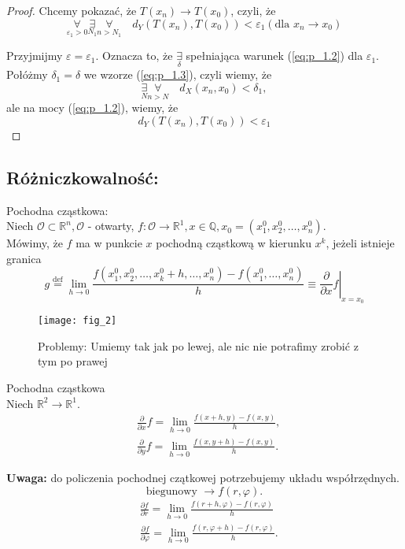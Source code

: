 \documentclass[../main.tex]{subfiles}
\begin{document}
\begin{proof}
Chcemy pokazać, że $T(x_n) \to T(x_0)$, czyli, że
    \[
        \underset{\varepsilon_1 > 0}{\forall} \underset{N_1}{\exists} \underset{n>N_1}{\forall} \quad d_Y (T(x_n),T(x_0)) < \varepsilon_1 (\text{dla } x_n \to x_0)
    \]

    Przyjmijmy $\varepsilon=\varepsilon_1$. Oznacza to, że $\underset{\delta}{\exists}$ spełniająca warunek (\ref{eq:p_1.2}) dla $\varepsilon_1$. Połóżmy $\delta_1=\delta$ we wzorze (\ref{eq:p_1.3}), czyli wiemy, że
    \[
        \underset{N}{\exists} \underset{n>N}{\forall} \quad d_X(x_n, x_0) < \delta_1,
    \]
    ale na mocy (\ref{eq:p_1.2}), wiemy, że
    \[
        d_Y (T(x_n),T(x_0)) < \varepsilon_1
    \]
\end{proof}

\pagebreak
\subsection{
    Różniczkowalność:
}

\begin{definicja}
    Pochodna cząstkowa:\\
    Niech $\mathcal{O}\subset\mathbb{R}^{n}, \mathcal{O}$ - otwarty,
    $f: \mathcal{O}\to\mathbb{R}^{1}, x\in\mathbb{Q}, x_0 = (x_1^0,x_2^0,\dots,x_n^0)$.\\
    Mówimy, że $f$ ma w punkcie $x$ pochodną cząstkową w kierunku $x^k$, jeżeli istnieje granica
    \[
        g \overset{\text{def}}{=} \lim\limits_{h \to 0}\frac{f(x_1^0, x_2^0, \dots, x_k^0 + h, \dots, x_n^0) - f(x_1^0,\dots,x_n^0)}{h} \equiv \left. \frac{\partial}{\partial x} f \right |_{x=x_0}
    \]
\end{definicja}

\begin{figure}
    \centering
    \texttt{[image: fig\_2]}
    \caption{Problemy: Umiemy tak jak po lewej, ale nic nie potrafimy zrobić z tym po prawej}
    \label{fig:fig_2}
\end{figure}

\begin{przyklad}
    Pochodna cząstkowa\\

    Niech $\mathbb{R}^{2}\to\mathbb{R}^{1}$.
    \begin{align*}
        &\frac{\partial}{\partial x} f = \lim\limits_{h \to 0}\frac{f(x+h,y) - f(x,y)}{h},\\
        &\frac{\partial}{\partial y} f = \lim\limits_{h \to 0}\frac{f(x,y+h) - f(x,y)}{h}
    .\end{align*}

    \textbf{Uwaga:} do policzenia pochodnej czątkowej potrzebujemy układu współrzędnych.
    \[
        \text{biegunowy } \to f(r,\varphi)
    .\]
\begin{align*}
    &\frac{\partial f}{\partial r} = \lim_{h \to 0} \frac{f(r+h, \varphi) - f(r,\varphi)}{h}\\
    &\frac{\partial f}{\partial \varphi} = \lim_{h \to 0} \frac{f(r, \varphi + h) - f(r,\varphi)}{h}
.\end{align*}

\end{przyklad}
\end{document}

